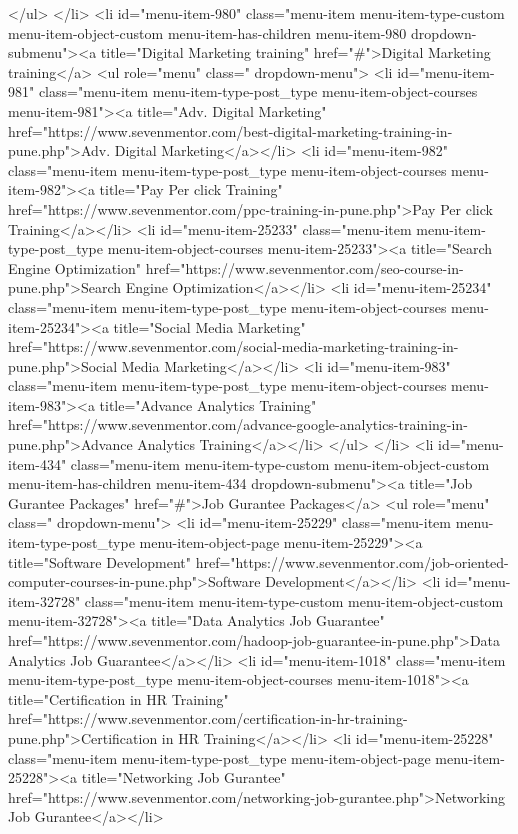 {</ul>
</li>
<li id="menu-item-980" class="menu-item menu-item-type-custom menu-item-object-custom menu-item-has-children menu-item-980 dropdown-submenu"><a title="Digital Marketing training" href="#">Digital Marketing training</a>
<ul role="menu" class=" dropdown-menu">
<li id="menu-item-981" class="menu-item menu-item-type-post_type menu-item-object-courses menu-item-981"><a title="Adv. Digital Marketing" href="https://www.sevenmentor.com/best-digital-marketing-training-in-pune.php">Adv. Digital Marketing</a></li>
<li id="menu-item-982" class="menu-item menu-item-type-post_type menu-item-object-courses menu-item-982"><a title="Pay Per click Training" href="https://www.sevenmentor.com/ppc-training-in-pune.php">Pay Per click Training</a></li>
<li id="menu-item-25233" class="menu-item menu-item-type-post_type menu-item-object-courses menu-item-25233"><a title="Search Engine Optimization" href="https://www.sevenmentor.com/seo-course-in-pune.php">Search Engine Optimization</a></li>
<li id="menu-item-25234" class="menu-item menu-item-type-post_type menu-item-object-courses menu-item-25234"><a title="Social Media Marketing" href="https://www.sevenmentor.com/social-media-marketing-training-in-pune.php">Social Media Marketing</a></li>
<li id="menu-item-983" class="menu-item menu-item-type-post_type menu-item-object-courses menu-item-983"><a title="Advance Analytics Training" href="https://www.sevenmentor.com/advance-google-analytics-training-in-pune.php">Advance Analytics Training</a></li>
</ul>
</li>
<li id="menu-item-434" class="menu-item menu-item-type-custom menu-item-object-custom menu-item-has-children menu-item-434 dropdown-submenu"><a title="Job Gurantee Packages" href="#">Job Gurantee Packages</a>
<ul role="menu" class=" dropdown-menu">
<li id="menu-item-25229" class="menu-item menu-item-type-post_type menu-item-object-page menu-item-25229"><a title="Software Development" href="https://www.sevenmentor.com/job-oriented-computer-courses-in-pune.php">Software Development</a></li>
<li id="menu-item-32728" class="menu-item menu-item-type-custom menu-item-object-custom menu-item-32728"><a title="Data Analytics Job Guarantee" href="https://www.sevenmentor.com/hadoop-job-guarantee-in-pune.php">Data Analytics Job Guarantee</a></li>
<li id="menu-item-1018" class="menu-item menu-item-type-post_type menu-item-object-courses menu-item-1018"><a title="Certification in HR Training" href="https://www.sevenmentor.com/certification-in-hr-training-pune.php">Certification in HR Training</a></li>
<li id="menu-item-25228" class="menu-item menu-item-type-post_type menu-item-object-page menu-item-25228"><a title="Networking Job Gurantee" href="https://www.sevenmentor.com/networking-job-gurantee.php">Networking Job Gurantee</a></li>
}

